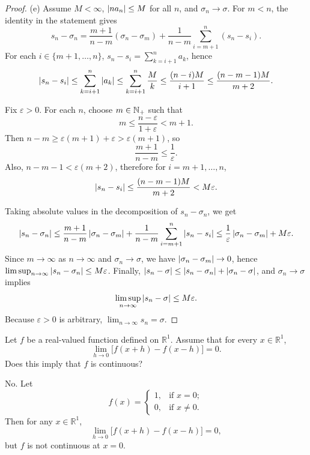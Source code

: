\documentclass{article}
\begin{document}
\begin{proof}
  (e) Assume \(M<\infty\), \(\left|na_n\right|\le M\) for all \(n\), and \(\sigma_n\to\sigma\). 
  For \(m<n\), the identity in the statement gives
  \[ s_n-\sigma_n
    =\frac{m+1}{n-m}(\sigma_n-\sigma_m)
    +\frac{1}{n-m}\sum_{i=m+1}^{n}(s_n-s_i). \]
  For each \(i\in\{m+1,\dots,n\}\), \( s_n-s_i=\sum_{k=i+1}^{n}a_k \), hence
  \[ \left|s_n-s_i\right|
    \le\sum_{k=i+1}^{n}\left|a_k\right|
    \le\sum_{k=i+1}^{n}\frac{M}{k}
    \le\frac{(n-i)M}{i+1}
    \le\frac{(n-m-1)M}{m+2}. \]\par
  Fix \(\varepsilon>0\). For each \(n\), choose \(m\in\mathbb{N}_+\) such that
  \[ m\le\frac{n-\varepsilon}{1+\varepsilon}<m+1. \]
  Then \( n-m\ge\varepsilon(m+1)+\varepsilon>\varepsilon(m+1) \), so
  \[ \frac{m+1}{n-m}\le\frac1\varepsilon. \]
  Also, \( n-m-1<\varepsilon(m+2) \), therefore for \(i=m+1,\dots,n\),
  \[ \left|s_n-s_i\right|
    \le\frac{(n-m-1)M}{m+2}
    <M\varepsilon. \]\par
    Taking absolute values in the decomposition of \(s_n-\sigma_n\), we get
  \[ \left|s_n-\sigma_n\right|
    \le \frac{m+1}{n-m}\left|\sigma_n-\sigma_m\right|
    +\frac{1}{n-m}\sum_{i=m+1}^{n}\left|s_n-s_i\right|
    \le \frac1\varepsilon\left|\sigma_n-\sigma_m\right|+M\varepsilon. \]
  Since \(m\to\infty\) as \(n\to\infty\) and \(\sigma_n\to\sigma\), we have \( \left|\sigma_n-\sigma_m\right|\to0 \), hence \( \limsup_{n\to\infty}\left|s_n-\sigma_n\right|\le M\varepsilon \). Finally, \( \left|s_n-\sigma\right|\le\left|s_n-\sigma_n\right|+\left|\sigma_n-\sigma\right| \), and \(\sigma_n\to\sigma\) implies
  \[ \limsup_{n\to\infty}\left|s_n-\sigma\right|\le M\varepsilon. \]
  Because \(\varepsilon>0\) is arbitrary, \(\lim_{n\to\infty}s_n=\sigma\).
\end{proof}



\begin{problem}[4-1]
Let $f$ be a real-valued function defined on $\mathbb{R}^1$. Assume that for every $x\in\mathbb{R}^1$,
\[
\lim_{h\to 0}\bigl[f(x+h)-f(x-h)\bigr]=0.
\]
Does this imply that $f$ is continuous?
\end{problem}

\begin{solution}
  No. Let
  \[ f(x)=\begin{cases}
    1, & \text{if } x=0;\\
    0, & \text{if } x\ne 0.
  \end{cases} \]
  Then for any $x\in\mathbb{R}^1$,
  \[ \lim_{h\to 0}\bigl[f(x+h)-f(x-h)\bigr]=0, \]
  but $f$ is not continuous at $x=0$.

\end{solution}
\end{document}
